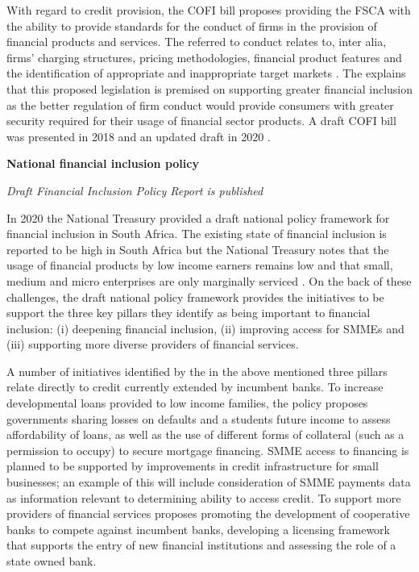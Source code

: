 \documentclass[
  letterpaper,
  DIV=11,
  numbers=noendperiod]{scrartcl}
\begin{document}
With regard to credit provision, the COFI bill proposes providing the
FSCA with the ability to provide standards for the conduct of firms in
the provision of financial products and services. The referred to
conduct relates to, inter alia, firms' charging structures, pricing
methodologies, financial product features and the identification of
appropriate and inappropriate target markets
\citep[\citet{cofi2020}]{cofi2018a}. The \citet{cofi2018b} explains that
this proposed legislation is premised on supporting greater financial
inclusion as the better regulation of firm conduct would provide
consumers with greater security required for their usage of financial
sector products. A draft COFI bill was presented in 2018 and an updated
draft in 2020 \citep{cofi2020}.

\textbf{National financial inclusion policy}

\emph{Draft Financial Inclusion Policy Report is published}

In 2020 the National Treasury provided a draft national policy framework
for financial inclusion in South Africa. The existing state of financial
inclusion is reported to be high in South Africa but the National
Treasury notes that the usage of financial products by low income
earners remains low and that small, medium and micro enterprises are
only marginally serviced \citep{nt2020}. On the back of these
challenges, the draft national policy framework provides the initiatives
to be support the three key pillars they identify as being important to
financial inclusion: (i) deepening financial inclusion, (ii) improving
access for SMMEs and (iii) supporting more diverse providers of
financial services.

A number of initiatives identified by the \citet{nt2020} in the above
mentioned three pillars relate directly to credit currently extended by
incumbent banks. To increase developmental loans provided to low income
families, the policy proposes governments sharing losses on defaults and
a students future income to assess affordability of loans, as well as
the use of different forms of collateral (such as a permission to
occupy) to secure mortgage financing. SMME access to financing is
planned to be supported by improvements in credit infrastructure for
small businesses; an example of this will include consideration of SMME
payments data as information relevant to determining ability to access
credit. To support more providers of financial services \citet{nt2020}
proposes promoting the development of cooperative banks to compete
against incumbent banks, developing a licensing framework that supports
the entry of new financial institutions and assessing the role of a
state owned bank.
\end{document}
